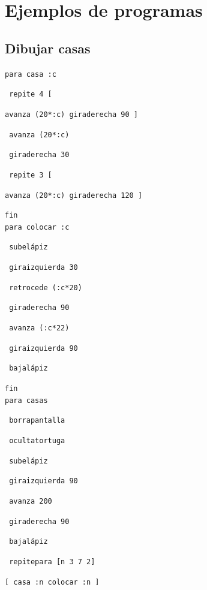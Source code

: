\chapter{Ejemplos de programas}
   \label{Ejemplos-Programas}

\section{Dibujar casas}
   \label{Dibujar-casas}

\noindent \texttt{para casa :c} 

\noindent \texttt{ repite 4 [}

  \texttt{avanza (20*:c) giraderecha 90 ]}

\noindent \texttt{ avanza (20*:c)}

\noindent \texttt{ giraderecha 30}

\noindent \texttt{ repite 3 [}

  \texttt{avanza (20*:c) giraderecha 120 ]}

\noindent \texttt{fin} \\

\noindent \texttt{para colocar :c}

\noindent \texttt{ subel\'apiz}

\noindent \texttt{ giraizquierda 30}

\noindent \texttt{ retrocede (:c*20)}

\noindent \texttt{ giraderecha 90}

\noindent \texttt{ avanza (:c*22)}

\noindent \texttt{ giraizquierda 90}

\noindent \texttt{ bajal\'apiz}

\noindent \texttt{fin} \\

\noindent \texttt{para casas}

\noindent \texttt{ borrapantalla}

\noindent \texttt{ ocultatortuga}

\noindent \texttt{ subel\'apiz}

\noindent \texttt{ giraizquierda 90}

\noindent \texttt{ avanza 200}

\noindent \texttt{ giraderecha 90}

\noindent \texttt{ bajal\'apiz}

\noindent \texttt{ repitepara [n 3 7 2]}

\texttt{[ casa :n colocar :n ]}

